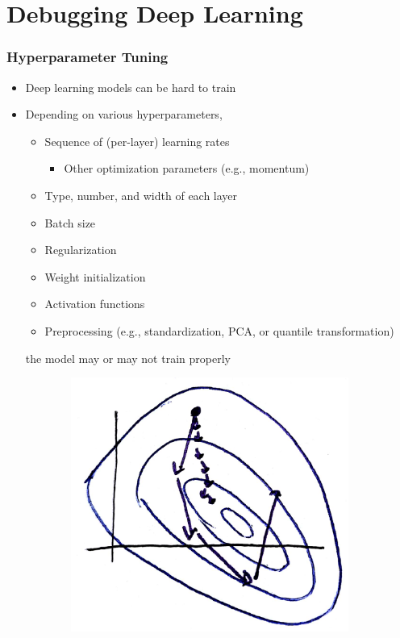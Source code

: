 \documentclass[10pt,mathserif]{beamer}
\begin{document}
\section{Debugging Deep Learning}

\begin{frame}
  \frametitle{Hyperparameter Tuning}
  \begin{itemize}
  \item Deep learning models can be hard to train
  \item Depending on various hyperparameters,
    \begin{itemize}
    \item Sequence of (per-layer) learning rates
      \begin{itemize}
      \item Other optimization parameters (e.g., momentum)
      \end{itemize}
    \item Type, number, and width of each layer
    \item Batch size
    \item Regularization
    \item Weight initialization
    \item Activation functions
    \item Preprocessing (e.g., standardization, PCA, or quantile transformation)
    \end{itemize}
    the model may or may not train properly
  \end{itemize}
\begin{figure}[ht]
  \centering
    \begin{subfigure}{.2\paperwidth}
      \centering
      \includegraphics[width=0.17\paperwidth]{figure/learning_rate_effect}

\end{subfigure}
\end{figure}
\end{frame}
\end{document}

